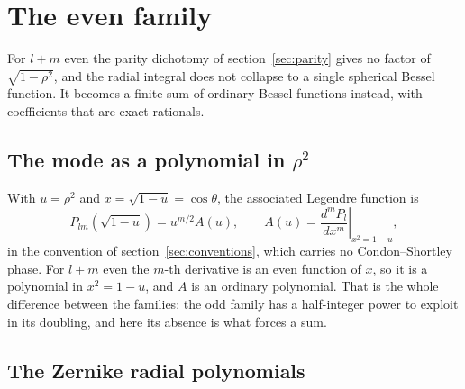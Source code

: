 
\section{The even family}
\label{sec:even}

For $l+m$ even the parity dichotomy of section~\ref{sec:parity} gives no factor of
$\sqrt{1-\rho^2}$, and the radial integral does not collapse to a single spherical
Bessel function.  It becomes a finite sum of ordinary Bessel functions instead, with
coefficients that are exact rationals.

\subsection{The mode as a polynomial in \texorpdfstring{$\rho^2$}{rho squared}}
\label{sec:even-polynomial}

With $u = \rho^2$ and $x = \sqrt{1-u} = \cos\theta$, the associated Legendre
function is
\begin{equation}
  P_{lm}\!\left(\sqrt{1-u}\right) = u^{m/2} A(u) , \qquad
  A(u) = \left. \frac{d^m P_l}{dx^m} \right|_{x^2 = 1-u} ,
  \label{eq:even-A}
\end{equation}
in the convention of section~\ref{sec:conventions}, which carries no Condon--Shortley
phase.  For $l+m$
even the $m$-th derivative is an even function of $x$, so it is a polynomial in
$x^2 = 1-u$, and $A$ is an ordinary polynomial.  That is the whole difference
between the families: the odd family has a half-integer power to exploit in its
doubling, and here its absence is what forces a sum.

\subsection{The Zernike radial polynomials}
\label{sec:zernike}

